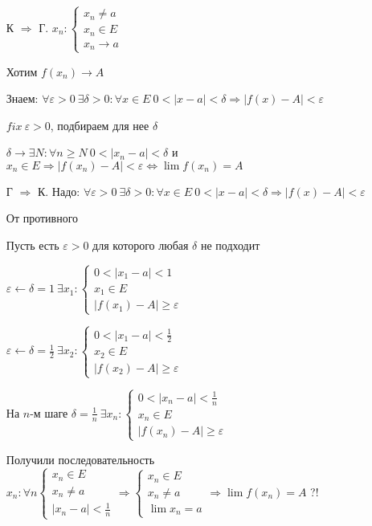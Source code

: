 \documentclass[14pt, letter paper]{article}
\begin{document}
\begin{itemize}
    \item[К $\Rightarrow$ Г.] $x_n : \begin{cases}
        x_n \neq a \\
        x_n \in E \\
        x_n \rightarrow a
    \end{cases}$

    Хотим $f(x_n) \rightarrow A$

    Знаем: $\forall \varepsilon > 0\ \exists \delta > 0 : \forall x \in E\ 0 < |x - a| < \delta \Rightarrow |f(x) - A| < \varepsilon$

    $fix\ \varepsilon > 0$, подбираем для нее $\delta$

    $\delta \rightarrow \exists N : \forall n \geq N\ 0 < |x_n - a| < \delta$ и $x_n \in E \Rightarrow |f(x_n) - A| < \varepsilon \Leftrightarrow \lim{f(x_n)} = A$

    \item[Г $\Rightarrow$ К.] Надо: $\forall \varepsilon > 0\ \exists \delta > 0: \forall x \in E\ 0 < |x - a| < \delta \Rightarrow |f(x) - A| < \varepsilon$
    
    От противного

    Пусть есть $\varepsilon > 0$ для которого любая $\delta$ не подходит

    $\varepsilon \leftarrow \delta = 1\ \exists x_1 : \begin{cases}
        0 < |x_1 - a| < 1 \\
        x_1 \in E \\
        |f(x_1) - A| \geq \varepsilon
    \end{cases}$

    $\varepsilon \leftarrow \delta = \frac{1}{2}\ \exists x_2 : \begin{cases}
        0 < |x_1 - a| < \frac{1}{2} \\
        x_2 \in E \\
        |f(x_2) - A| \geq \varepsilon
    \end{cases}$

    На $n$-м шаге $\delta = \frac{1}{n}\ \exists x_n : \begin{cases}
        0 < |x_n - a| < \frac{1}{n} \\
        x_n \in E \\
        |f(x_n) - A| \geq \varepsilon
    \end{cases}$

    Получили последовательность $x_n : \forall n \begin{cases}
        x_n \in E \\
        x_n \neq a \\
        |x_n - a| < \frac{1}{n}
    \end{cases} \Rightarrow \begin{cases}
        x_n \in E \\
        x_n \neq a \\
        \lim{x_n} = a
    \end{cases} \Rightarrow \lim{f(x_n)} = A$ ?!
\end{itemize}
\end{document}
